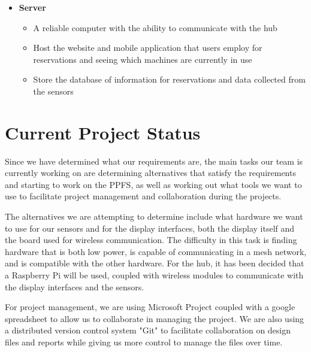 \documentclass[letterpaper,11pt]{./templates/texMemo} %
\begin{document}
\begin{itemize}
    \item{\textbf{Server}}
    \begin{itemize}
        \item{A reliable computer with the ability to communicate with the hub}
        \item{Host the website and mobile application that users employ for reservations and seeing which machines are currently in use}
        \item{Store the database of information for reservations and data collected from the sensors}
    \end{itemize}
    \end{itemize}

\section{Current Project Status}		

Since we have determined what our requirements are, the main tasks our team is currently working on are determining alternatives that satisfy the requirements and starting to work on the PPFS, as well as working out what  tools we want to use to facilitate project management and collaboration during the projects.

The alternatives we are attempting to determine include what hardware we want to use for our sensors and for the display interfaces, both the display itself and the board used for wireless communication. The difficulty in this task is finding hardware that is both low power, is capable of communicating in a mesh network, and is compatible with the other hardware. For the hub, it has been decided that a Raspberry Pi will be used, coupled with wireless modules to communicate with the display interfaces and the sensors.

For project management, we are using Microsoft Project coupled with a google spreadsheet to allow us to collaborate in managing the project. We are also using a distributed version control system "Git" to facilitate collaboration on design files and reports while giving us more control to manage the files over time.
\end{document}
